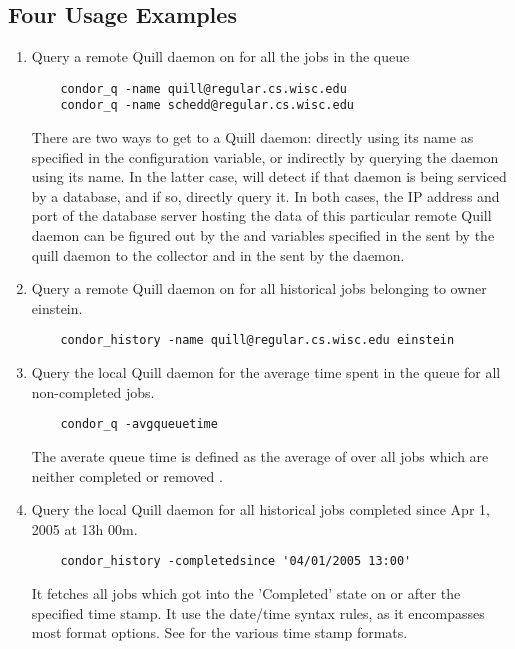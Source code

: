 \subsection{\label{sec:Quill-Example}Four Usage Examples}


\begin{enumerate}
\item Query a remote Quill daemon on 
for all the jobs in the queue
\begin{verbatim}
	condor_q -name quill@regular.cs.wisc.edu
	condor_q -name schedd@regular.cs.wisc.edu

\end{verbatim}
There are two ways to get to a Quill daemon: directly using its name as 
specified in the  configuration variable, or indirectly
by querying the  daemon using its name.
In the latter case,  will detect 
if that  daemon is being serviced by a database, and if so, directly query it.
In both cases, the IP address and port of the database server hosting the data of 
this particular remote Quill daemon can be figured out by the  
and  variables specified in the 
sent by the quill daemon to the collector and in the  sent by
the  daemon.  

\item Query a remote Quill daemon on  for all historical 
jobs belonging to owner einstein.
\begin{verbatim}
	condor_history -name quill@regular.cs.wisc.edu einstein
\end{verbatim}

\item Query the local Quill daemon for the average time spent in the queue 
for all non-completed jobs. 
\begin{verbatim}
	condor_q -avgqueuetime 
\end{verbatim}
The averate queue time is defined as the average of
 over all jobs which are neither
completed  or removed .

\item Query the local Quill daemon for all historical jobs completed since 
Apr 1, 2005 at 13h 00m.
\begin{verbatim}
	condor_history -completedsince '04/01/2005 13:00'
\end{verbatim}
It fetches all jobs
which got into the 'Completed' state on or after the
specified time stamp.  It use the  date/time
syntax rules, as it encompasses most format options.  See
for the various time stamp formats.

\end{enumerate}

